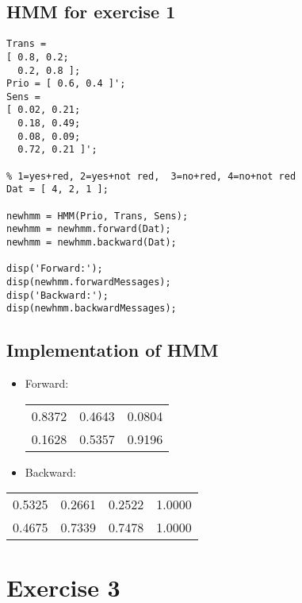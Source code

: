 \documentclass[colorlinks=true,linkcolor=blue]{article}
\begin{document}
\subsection{HMM for exercise 1}
\label{sec-2-2}
\begin{verbatim}
Trans = 
[ 0.8, 0.2; 
  0.2, 0.8 ];
Prio = [ 0.6, 0.4 ]';
Sens = 
[ 0.02, 0.21; 
  0.18, 0.49; 
  0.08, 0.09; 
  0.72, 0.21 ]';

% 1=yes+red, 2=yes+not red,  3=no+red, 4=no+not red
Dat = [ 4, 2, 1 ];

newhmm = HMM(Prio, Trans, Sens);
newhmm = newhmm.forward(Dat);
newhmm = newhmm.backward(Dat);

disp('Forward:');
disp(newhmm.forwardMessages);
disp('Backward:');
disp(newhmm.backwardMessages);
\end{verbatim}

\subsection{Implementation of HMM}
\label{sec-2-3}
\begin{itemize}
\item Forward:
\begin{center}
\begin{tabular}{rrr}
0.8372 & 0.4643 & 0.0804\\
0.1628 & 0.5357 & 0.9196\\
\end{tabular}
\end{center}

\item Backward:
\end{itemize}
\begin{center}
\begin{tabular}{rrrr}
0.5325 & 0.2661 & 0.2522 & 1.0000\\
0.4675 & 0.7339 & 0.7478 & 1.0000\\
\end{tabular}
\end{center}
\section{Exercise 3}
\label{sec-3}
\end{document}

